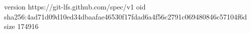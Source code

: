 version https://git-lfs.github.com/spec/v1
oid sha256:4ad71d09d10ed34dbaafae46530f17fdad6a4f56c2791c069480846c57104f6d
size 174916
